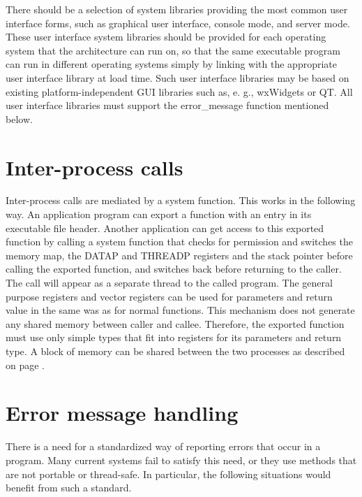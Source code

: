 \documentclass[forwardcom.tex]{subfiles}
\begin{document}
There should be a selection of system libraries providing the most common user interface forms, such as graphical user interface, console mode, and server mode. These user interface system libraries should be provided for each operating system that the architecture can run on, so that the same executable program can run in different operating systems simply by linking with the appropriate user interface library at load time. Such user interface libraries may be based on existing platform-independent GUI libraries such as, e. g., wxWidgets or QT. All user interface libraries must support the error\_message function mentioned below. 

\section{Inter-process calls} \label{interProcessCalls}
Inter-process calls are mediated by a system function. This works in the following way. An application program can export a function with an entry in its executable file header. Another application can get access to this exported function by calling a system function that checks for permission and switches the memory map, the DATAP and THREADP registers and the stack pointer before calling the exported function, and switches back before returning to the caller. The call will appear as a separate thread to the called program. The general purpose registers and vector registers can be used for parameters and return value in the same was as for normal functions. This mechanism does not generate any shared memory between caller and callee. Therefore, the exported function must use only simple types that fit into registers for its parameters and return type. A block of memory can be shared between the two processes as described on page \pageref{sharedMemory}. 


\section{Error message handling} \label{errorMessageHandling}
There is a need for a standardized way of reporting errors that occur in a program. Many current systems fail to satisfy this need, or they use methods that are not portable or thread-safe. In particular, the following situations would benefit from such a standard. 
\end{document}
